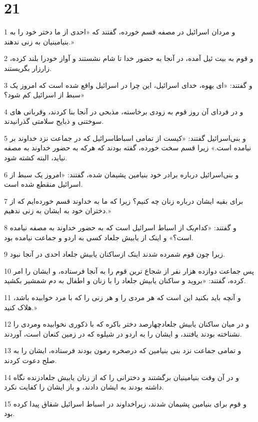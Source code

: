 \chapter{21}

\par 1 و مردان اسرائیل در مصفه قسم خورده، گفتند که «احدی از ما دختر خود را به بنیامینیان به زنی ندهند.»
\par 2 و قوم به بیت ئیل آمده، در آنجا به حضور خدا تا شام نشستند و آواز خودرا بلند کرده، زار‌زار بگریستند.
\par 3 و گفتند: «ای یهوه، خدای اسرائیل، این چرا در اسرائیل واقع شده است که امروز یک سبط از اسرائیل کم شود؟»
\par 4 و در فردای آن روز قوم به زودی برخاسته، مذبحی در آنجا بنا کردند، وقربانی های سوختنی و ذبایح سلامتی گذرانیدند.
\par 5 و بنی‌اسرائیل گفتند: «کیست از تمامی اسباطاسرائیل که در جماعت نزد خداوند بر نیامده است.» زیرا قسم سخت خورده، گفته بودند که هرکه به حضور خداوند به مصفه نیاید، البته کشته شود.
\par 6 و بنی‌اسرائیل درباره برادر خود بنیامین پشیمان شده، گفتند: «امروز یک سبط از اسرائیل منقطع شده است.
\par 7 برای بقیه ایشان درباره زنان چه کنیم؟ زیرا که ما به خداوند قسم خورده‌ایم که از دختران خود به ایشان به زنی ندهیم.»
\par 8 و گفتند: «کدام‌یک از اسباط اسرائیل است که به حضور خداوند به مصفه نیامده است؟» و اینک از یابیش جلعاد کسی به اردو و جماعت نیامده بود.
\par 9 زیرا چون قوم شمرده شدند اینک ازساکنان یابیش جلعاد احدی در آنجا نبود.
\par 10 پس جماعت دوازده هزار نفر از شجاع ترین قوم را به آنجا فرستاده، و ایشان را امر کرده، گفتند: «بروید و ساکنان یابیش جلعاد را با زنان و اطفال به دم شمشیر بکشید.
\par 11 و آنچه باید بکنید این است که هر مردی را و هر زنی را که با مرد خوابیده باشد، هلاک کنید.»
\par 12 و در میان ساکنان یابیش جلعادچهارصد دختر باکره که با ذکوری نخوابیده ومردی را نشناخته بودند یافتند، و ایشان را به اردو در شیلوه که در زمین کنعان است، آوردند. 
\par 13 و تمامی جماعت نزد بنی بنیامین که درصخره رمون بودند فرستاده، ایشان را به صلح دعوت کردند.
\par 14 و در آن وقت بنیامینیان برگشتند و دخترانی را که از زنان یابیش جلعادزنده نگاه داشته بودند به ایشان دادند، و باز ایشان را کفایت نکرد.
\par 15 و قوم برای بنیامین پشیمان شدند، زیراخداوند در اسباط اسرائیل شقاق پیدا کرده بود.
